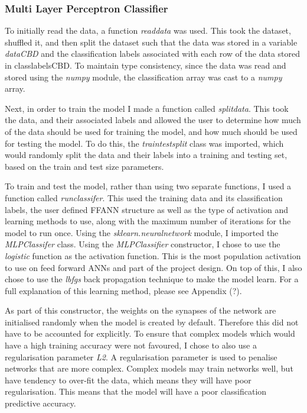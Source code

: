 \documentclass[11pt]{article}
\begin{document}
\subsubsection{Multi Layer Perceptron Classifier}\label{subsubsec:MLP}
To initially read the data, a function \textit{read\textunderscore data} was used. This took the dataset, shuffled it, and then split the dataset such that the data was stored in a variable \textit{data\textunderscore CBD} and the classification labels associated with each row of the data stored in {class\textunderscore labels\textunderscore CBD}. To maintain type consistency, since the data was read and stored using the \textit{numpy} module, the classification array was cast to a \textit{numpy} array. 

Next, in order to train the model I made a function called \textit{split\textunderscore data}. This took the data, and their associated labels and allowed the user to determine how much of the data should be used for training the model, and how much should be used for testing the model. To do this, the \textit{train\textunderscore test\textunderscore split} class was imported, which would randomly split the data and their labels into a training and testing set, based on the train and test size parameters. 

To train and test the model, rather than using two separate functions, I used a function called \textit{run\textunderscore classifer}. This used the training data and its classification labels, the user defined FFANN structure as well as the type of activation and learning methods to use, along with the maximum number of iterations for the model to run once. Using the \textit{sklearn.neural\textunderscore network} module, I imported the \textit{MLPClassifer} class. Using the \textit{MLPClassifier} constructor, I chose to use the \textit{logistic} function as the activation function. This is the most population activation to use on feed forward ANNs and part of the project design. On top of this,  I also chose to use the \textit{lbfgs} back propagation technique to make the model learn. For a full explanation of this learning method, please see Appendix (?). 

As part of this constructor, the weights on the synapses of the network are initialised randomly when the model is created by default. Therefore this did not have to be accounted for explicitly. 
To ensure that complex models which would have a high training accuracy were not favoured, I chose to also use a regularisation parameter \textit{L2}. A regularisation parameter is used to penalise networks that are more complex. Complex models may train networks well, but have tendency to over-fit the data, which means they will have poor regularisation. This means that the model will have a poor classification predictive accuracy. 
\end{document}
